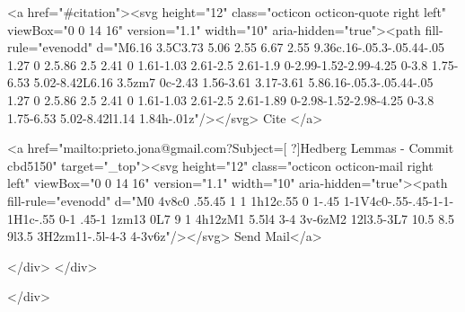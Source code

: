       <a  href="#citation"><svg height="12" class="octicon octicon-quote right left" viewBox="0 0 14 16" version="1.1" width="10" aria-hidden="true"><path fill-rule="evenodd" d="M6.16 3.5C3.73 5.06 2.55 6.67 2.55 9.36c.16-.05.3-.05.44-.05 1.27 0 2.5.86 2.5 2.41 0 1.61-1.03 2.61-2.5 2.61-1.9 0-2.99-1.52-2.99-4.25 0-3.8 1.75-6.53 5.02-8.42L6.16 3.5zm7 0c-2.43 1.56-3.61 3.17-3.61 5.86.16-.05.3-.05.44-.05 1.27 0 2.5.86 2.5 2.41 0 1.61-1.03 2.61-2.5 2.61-1.89 0-2.98-1.52-2.98-4.25 0-3.8 1.75-6.53 5.02-8.42l1.14 1.84h-.01z"/></svg> Cite
      </a>

      <a href="mailto:prieto.jona@gmail.com?Subject=[ ?]Hedberg Lemmas - Commit cbd5150" target="_top"><svg height="12" class="octicon octicon-mail right left" viewBox="0 0 14 16" version="1.1" width="10" aria-hidden="true"><path fill-rule="evenodd" d="M0 4v8c0 .55.45 1 1 1h12c.55 0 1-.45 1-1V4c0-.55-.45-1-1-1H1c-.55 0-1 .45-1 1zm13 0L7 9 1 4h12zM1 5.5l4 3-4 3v-6zM2 12l3.5-3L7 10.5 8.5 9l3.5 3H2zm11-.5l-4-3 4-3v6z"/></svg> Send Mail</a>

    </div>
  </div>

</div>




